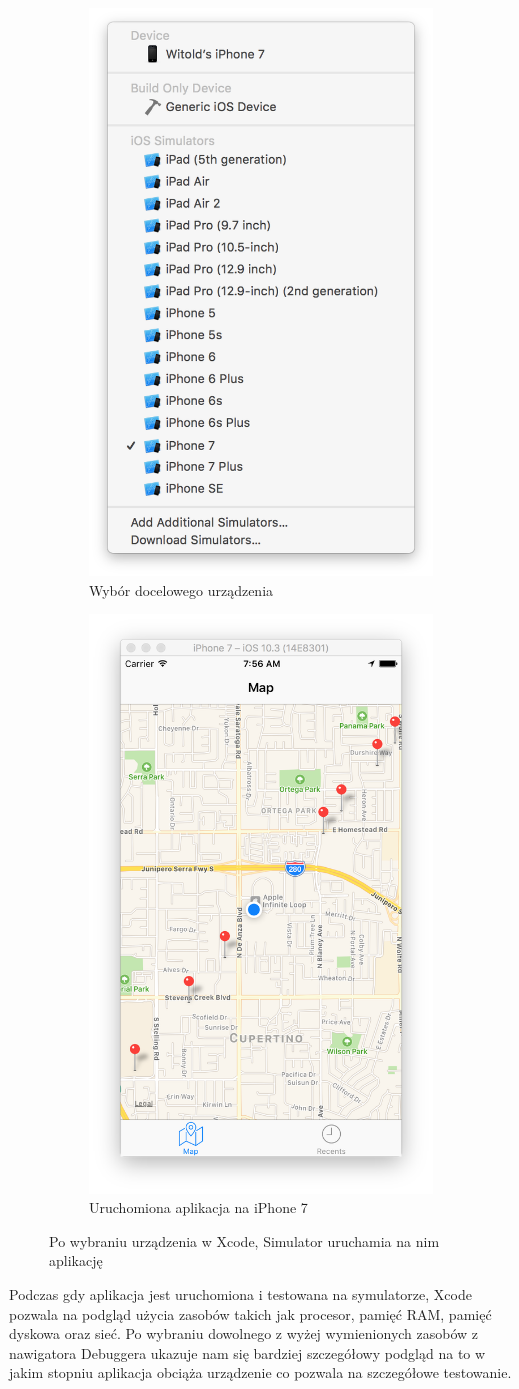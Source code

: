 \begin{figure}[ht!]
\centering
\begin{subfigure}{.5\textwidth}
  \centering
  \includegraphics[width=.4\linewidth]{images/chapter-2-image-3-target.png}
  \caption{Wybór docelowego urządzenia}
  \label{chapter-2-image-3-target}
\end{subfigure}%
\begin{subfigure}{.5\textwidth}
  \centering
  \includegraphics[width=.4\linewidth]{images/chapter-2-image-4-simulator.png}
  \caption{Uruchomiona aplikacja na iPhone 7}
  \label{chapter-2-image-4-simulator}
\end{subfigure}
\caption{Po wybraniu urządzenia w Xcode, Simulator uruchamia na nim aplikację}
\label{chapter-2-image-4-5}
\end{figure}

Podczas gdy aplikacja jest uruchomiona i testowana na symulatorze, Xcode pozwala na podgląd użycia zasobów takich jak procesor, pamięć RAM, pamięć dyskowa oraz sieć. Po wybraniu dowolnego z wyżej wymienionych zasobów z nawigatora Debuggera ukazuje nam się bardziej szczegółowy podgląd na to w jakim stopniu aplikacja obciąża urządzenie co pozwala na szczegółowe testowanie.

